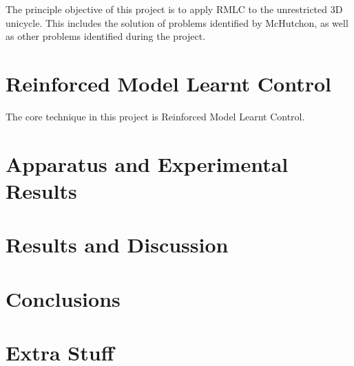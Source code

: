 \documentclass{IIBproject}
\begin{document}
The principle objective of this project is to apply RMLC to the unrestricted
3D unicycle. This includes the solution of problems identified by McHutchon,
as well as other problems identified during the project.


\section{Reinforced Model Learnt Control}

The core technique in this project is Reinforced Model Learnt Control. 

\section{Apparatus and Experimental Results}

\section{Results and Discussion}

\section{Conclusions}




\pagebreak
\appendix

\section{Extra Stuff}
\end{document}
